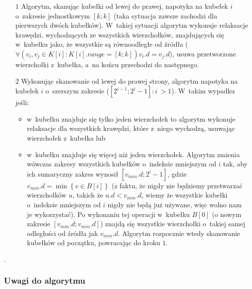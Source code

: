 \begin{itemize}
	\item[$1$] Algorytm, skanując kubełki od lewej do prawej, napotyka na kubełek $i$ o~zakresie jednostkowym $\left[ k ; k \right]$ (taka sytuacja zawsze zachodzi dla pierwszych dwóch kubełków). W~takiej sytuacji algorytm wykonuje relaksacje krawędzi, wychodzących ze wszystkich wierzchołków, znajdujących się w~kubełku jako, że wszystkie są równoodległe od źródła ($ \forall \left( v_{i}, v_{j} \in K \left[ i \right] : K \left[ i \right].range = \left[ k ; k \right] \right) v_{i}.d = v_{j}.d $), usuwa przetworzone wierzchołki z~kubełka, a~na końcu przechodzi do następnego.
	\item[$2$] Wykonując skanowanie od lewej do prawej strony, algorytm napotyka na kubełek $i$ o~szerszym zakresie ($ \left[ 2^{i-1} ; 2^{i} - 1 \right] : i~> 1$). W~takim wypadku jeśli:
	\begin{itemize}
		\item w~kubełku znajduje się tylko jeden wierzchołek to algorytm wykonuje relaksacje dla wszystkich krawędzi, które z~niego wychodzą, usuwając wierzchołek z~kubełka lub
		\item w~kubełku znajduje się więcej niż jeden wierzchołek. Algorytm zmienia wówczas zakresy wszystkich kubełków o~indeksie mniejszym od $i$ tak, aby ich sumaryczny zakres wynosił $ \left[ v_{min}.d ; 2^{i} - 1 \right] $, gdzie $v_{min}.d = \min \left\{ v \in B \left[ i \right] \right\}$ (z faktu, że nigdy nie będziemy przetwarzać wierzchołków $u$, takich że $u.d < v_{min}.d$, wiemy że wszystkie kubełki o~indeksie mniejszym od $i$ nigdy nie będą już używane, więc wolno nam je wykorzystać). Po wykonaniu tej operacji w~kubełku $B \left[ 0 \right]$ (o nowym zakresie $\left[ v_{min}.d ; v_{min}.d \right]$) znajdą się wszystkie wierzchołki o~takiej samej odległości od źródła jak $v_{min}.d$. Algorytm rozpocznie wtedy skanowanie kubełków od początku, powracając do kroku $1$.
	\end{itemize}
\end{itemize}.

\subsubsection{Uwagi do algorytmu}

